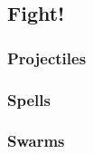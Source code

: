 \begin{multicols}{2}

\subsection*{Fight!}





\commonWeaponsChart



\commonArmourChart



\subsubsection*{Projectiles}



\subsubsection*{Spells}



\subsubsection*{Swarms}



\bigLine



\end{multicols}

